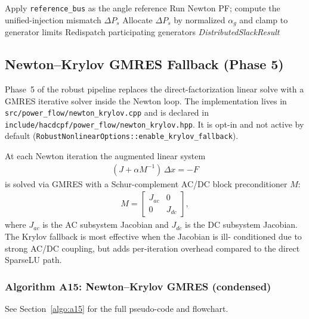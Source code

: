 \begin{algorithmic}[1]
  \State Apply \texttt{reference\_bus} as the angle reference
  \Repeat
    \State Run Newton PF; compute the unified-injection mismatch $\Delta P_s$
    \State Allocate $\Delta P_s$ by normalized $\alpha_g$ and clamp to generator limits
    \State Redispatch participating generators
  \State \Return \textit{DistributedSlackResult}
\EndProcedure
\end{algorithmic}

\subsection{Newton--Krylov GMRES Fallback (Phase 5)}
\label{sec:newton-krylov}

Phase~5 of the robust pipeline replaces the direct-factorization linear solve
with a GMRES iterative solver inside the Newton loop.  The implementation lives
in \texttt{src/power\_flow/newton\_krylov.cpp} and is declared in
\texttt{include/hacdcpf/power\_flow/newton\_krylov.hpp}.  It is opt-in and not
active by default (\texttt{RobustNonlinearOptions::enable\_krylov\_fallback}).

At each Newton iteration the augmented linear system
\begin{align}
(J + \alpha M^{-1})\,\Delta x = -F
\end{align}
is solved via GMRES with a Schur-complement AC/DC block preconditioner $M$:
\begin{align}
M =
\begin{bmatrix}
J_{ac} & 0 \\
0 & J_{dc}
\end{bmatrix},
\end{align}
where $J_{ac}$ is the AC subsystem Jacobian and $J_{dc}$ is the DC subsystem
Jacobian.  The Krylov fallback is most effective when the Jacobian is ill-
conditioned due to strong AC/DC coupling, but adds per-iteration overhead
compared to the direct SparseLU path.

\subsubsection{Algorithm A15: Newton--Krylov GMRES (condensed)}
\label{algo:a15-inline}
See Section~\ref{algo:a15} for the full pseudo-code and flowchart.

